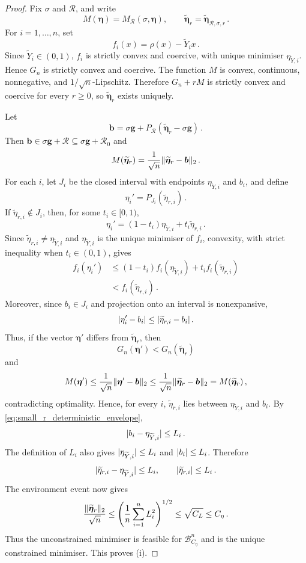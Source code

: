 \documentclass[10pt,a4paper]{amsart}
\makeatletter
\def\Ytil{\widetilde{Y}}
\newcommand{\abs}[1]{%
	\ensuremath{%
		\if@display
		\left| #1 \right|
		\else
		\lvert #1 \rvert
		\fi
	}%
}
\newcommand*{\bb}{\boldsymbol}
\def\bg{\bb{g}}
\newcommand{\vnorm}[1]{%
	\ensuremath{%
		\if@display
		\left\| #1 \right\|
		\else
		\| #1 \|
		\fi
	}%
}
\makeatother
\begin{document}
\begin{proof}
Fix $\sigma$ and $\mathcal R$, and write
$$
	M(\bb\eta)
	=
	M_{\mathcal R}(\sigma,\bb\eta),
	\qquad
	\widetilde{\bb\eta}_r
	=
	\widetilde{\bb\eta}_{\mathcal R,\sigma,r}\,.
$$
For $i=1,\ldots,n$, set
$$
	f_i(x)
	=
	\rho(x)-\Ytil_i x\,.
$$
Since $\Ytil_i\in(0,1)$, $f_i$ is strictly convex and coercive, with
unique minimiser $\eta_{\Ytil,i}$. Hence $G_n$ is strictly convex and
coercive. The function $M$ is convex, continuous, nonnegative, and
$1/\sqrt n$-Lipschitz. Therefore
$G_n+rM$ is strictly convex and coercive for every $r\geq0$, so
$\widetilde{\bb\eta}_r$ exists uniquely.

Let
$$
	\bb b
	=
	\sigma\bg
	+
	P_{\mathcal R}
	(\widetilde{\bb\eta}_r-\sigma\bg)\,.
$$
Then $\bb b\in\sigma\bg+\mathcal R\subseteq\sigma\bg+\mathcal R_0$ and
$$
	M(\widetilde{\bb\eta}_r)
	=
	\frac1{\sqrt n}
	\vnorm{\widetilde{\bb\eta}_r-\bb b}_2\,.
$$
For each $i$, let $J_i$ be the closed interval with endpoints
$\eta_{\Ytil,i}$ and $b_i$, and define
$$
	\eta_i'
	=
	P_{J_i}(\widetilde\eta_{r,i})\,.
$$
If $\widetilde\eta_{r,i}\notin J_i$, then, for some
$t_i\in[0,1)$,
$$
	\eta_i'
	=
	(1-t_i)\eta_{\Ytil,i}
	+
	t_i\widetilde\eta_{r,i}\,.
$$
Since $\widetilde\eta_{r,i}\neq\eta_{\Ytil,i}$ and
$\eta_{\Ytil,i}$ is the unique minimiser of $f_i$, convexity, with strict
inequality when $t_i\in(0,1)$, gives
$$
\begin{aligned}
	f_i(\eta_i')
	&\leq
	(1-t_i)f_i(\eta_{\Ytil,i})
	+
	t_i f_i(\widetilde\eta_{r,i})
	\\
	&<
	f_i(\widetilde\eta_{r,i})\,.
\end{aligned}
$$
Moreover, since $b_i\in J_i$ and projection onto an interval is
nonexpansive,
$$
	\abs{\eta_i'-b_i}
	\leq
	\abs{\widetilde\eta_{r,i}-b_i}\,.
$$
Thus, if the vector $\bb\eta'$ differs from
$\widetilde{\bb\eta}_r$, then
$$
	G_n(\bb\eta')
	<
	G_n(\widetilde{\bb\eta}_r)
$$
and
$$
	M(\bb\eta')
	\leq
	\frac1{\sqrt n}\vnorm{\bb\eta'-\bb b}_2
	\leq
	\frac1{\sqrt n}\vnorm{\widetilde{\bb\eta}_r-\bb b}_2
	=
	M(\widetilde{\bb\eta}_r)\,,
$$
contradicting optimality. Hence, for every $i$,
$\widetilde\eta_{r,i}$ lies between $\eta_{\Ytil,i}$ and $b_i$.
By \eqref{eq:small_r_deterministic_envelope},
$$
	\abs{b_i-\eta_{\Ytil,i}}
	\leq
	L_i\,.
$$
The definition of $L_i$ also gives
$\abs{\eta_{\Ytil,i}}\leq L_i$ and $\abs{b_i}\leq L_i$. Therefore
\begin{equation}
\label{eq:small_r_coordinate_envelope}
	\abs{
		\widetilde\eta_{r,i}-\eta_{\Ytil,i}
	}
	\leq
	L_i,
	\qquad
	\abs{\widetilde\eta_{r,i}}
	\leq
	L_i\,.
\end{equation}
The environment event now gives
$$
	\frac{\vnorm{\widetilde{\bb\eta}_r}_2}{\sqrt n}
	\leq
	\left(
		\frac1n\sum_{i=1}^nL_i^2
	\right)^{1/2}
	\leq
	\sqrt{C_L}
	\leq
	C_\eta\,.
$$
Thus the unconstrained minimiser is feasible for
$\mathcal B^n_{C_\eta}$ and is the unique constrained minimiser. This proves
(i).


\end{proof}
\end{document}
